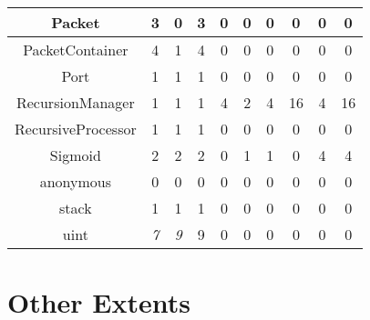 \begin{tabular}{|c|c|c|c|c|c|c|c|c|c|}
 \hline 
 Packet & 3 & 0 & 3 & 0 & 0 & 0 & 0 & 0 & 0 \\
 \hline 
 PacketContainer & 4 & 1 & 4 & 0 & 0 & 0 & 0 & 0 & 0 \\
 \hline 
 Port & 1 & 1 & 1 & 0 & 0 & 0 & 0 & 0 & 0 \\
 \hline 
 RecursionManager & 1 & 1 & 1 & 4 & 2 & 4 & 16 & 4 & 16 \\
 \hline 
 RecursiveProcessor & 1 & 1 & 1 & 0 & 0 & 0 & 0 & 0 & 0 \\
 \hline 
 Sigmoid & 2 & 2 & 2 & 0 & 1 & 1 & 0 & 4 & 4 \\
 \hline 
 anonymous & 0 & 0 & 0 & 0 & 0 & 0 & 0 & 0 & 0 \\
 \hline 
 stack & 1 & 1 & 1 & 0 & 0 & 0 & 0 & 0 & 0 \\
 \hline 
 uint &\emph{ 7}
 &\emph{ 9}
 & 9 & 0 & 0 & 0 & 0 & 0 & 0 \\
 \hline 

\end{tabular}

\section{Other Extents}


